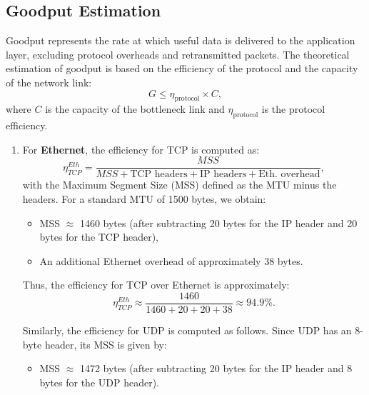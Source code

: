     \subsection{Goodput Estimation} \label{subsec:goodput-estimation}

        Goodput represents the rate at which useful data is delivered to the application layer, excluding protocol overheads and retransmitted packets. 
        The theoretical estimation of goodput is based on the efficiency of the protocol and the capacity of the network link:
        \[
        G \leq \eta_{\text{protocol}} \times C,
        \]
        where \(C\) is the capacity of the bottleneck link and \(\eta_{\text{protocol}}\) is the protocol efficiency.

        \begin{enumerate}

            \item 
                For \textbf{Ethernet}, the efficiency for TCP is computed as:
                \[
                \eta_{TCP}^{Eth} = \frac{MSS}{MSS + \text{TCP headers} + \text{IP headers} + \text{Eth. overhead}},
                \]
                with the Maximum Segment Size (MSS) defined as the MTU minus the headers. For a standard MTU of 1500 bytes, we obtain:

                \begin{itemize}
                    \item MSS \(\approx\) 1460 bytes (after subtracting 20 bytes for the IP header and 20 bytes for the TCP header),
                    \item An additional Ethernet overhead of approximately 38 bytes.
                \end{itemize}

                \noindent Thus, the efficiency for TCP over Ethernet is approximately:
                \[
                \eta_{TCP}^{Eth} \approx \frac{1460}{1460 + 20 + 20 + 38} \approx 94.9\%.
                \]

                \noindent Similarly, the efficiency for UDP is computed as follows. Since UDP has an 8-byte header, its MSS is given by:

                \begin{itemize}
                    \item MSS \(\approx\) 1472 bytes (after subtracting 20 bytes for the IP header and 8 bytes for the UDP header).
                \end{itemize}


\end{enumerate}
